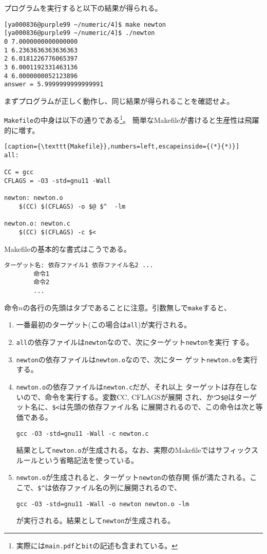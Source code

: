 \documentclass[a4paper]{jsarticle}
\begin{document}
プログラムを実行すると以下の結果が得られる。
\begin{lstlisting}
[ya000836@purple99 ~/numeric/4]$ make newton
[ya000836@purple99 ~/numeric/4]$ ./newton
0 7.0000000000000000
1 6.2363636363636363
2 6.0181226776065397
3 6.0001192331463136
4 6.0000000052123896
answer = 5.9999999999999991
\end{lstlisting}
まずプログラムが正しく動作し、同じ結果が得られることを確認せよ。

\texttt{Makefile}の中身は以下の通りである\footnote{実際には\texttt{main.pdf}と\texttt{bit}の記述も含まれている。}。
簡単なMakefileが書けると生産性は飛躍的に増す。
\begin{lstlisting}[caption={\texttt{Makefile}},numbers=left,escapeinside={(*}{*)}]
all:

CC = gcc
CFLAGS = -O3 -std=gnu11 -Wall

newton: newton.o
	$(CC) $(CFLAGS) -o $@ $^  -lm

newton.o: newton.c
	$(CC) $(CFLAGS) -c $<
\end{lstlisting}

Makefileの基本的な書式はこうである。
\begin{lstlisting}
ターゲット名: 依存ファイル1 依存ファイル名2 ...
        命令1
        命令2
        ...
\end{lstlisting}
命令$n$の各行の先頭はタブであることに注意。引数無しで\texttt{make}すると、
\begin{enumerate}
 \item 一番最初のターゲット(この場合は\texttt{all})が実行される。
 \item \texttt{all}の依存ファイルは\texttt{newton}なので、次にターゲット\texttt{newton}を実行
する。
 \item \texttt{newton}の依存ファイルは\texttt{newton.o}なので、次にター
       ゲット\texttt{newton.o}を実行する。
 \item \texttt{newton.o}の依存ファイルは\texttt{newton.c}だが、それ以上
       ターゲットは存在しないので、命令を実行する。変数CC, CFLAGSが展開
       され、かつ\verb|$@|はターゲット名に、\verb|$<|は先頭の依存ファイル名
       に展開されるので、この命令は次と等価である。
\begin{lstlisting}
gcc -O3 -std=gnu11 -Wall -c newton.c
\end{lstlisting}
結果として\texttt{newton.o}が生成される。なお、実際のMakefileではサフィックス
ルールという省略記法を使っている。
\item \texttt{newton.o}が生成されると、ターゲット\texttt{newton}の依存関
      係が満たされる。ここで、\verb|$^|は依存ファイル名の列に展開されるので、
\begin{lstlisting}
gcc -O3 -std=gnu11 -Wall -o newton newton.o -lm
\end{lstlisting}
が実行される。結果として\texttt{newton}が生成される。
\end{enumerate}
\end{document}
